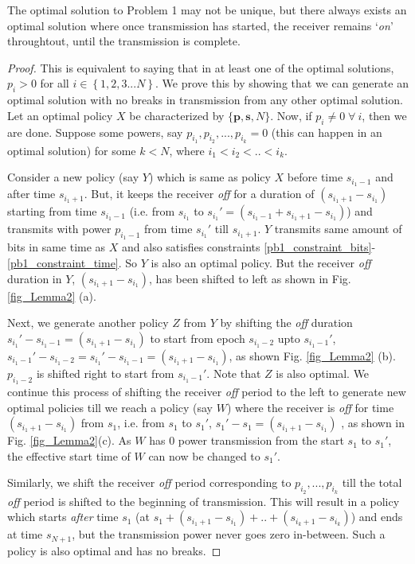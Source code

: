 \begin{lemma}
The optimal solution to Problem 1 may not be unique, but there always exists an optimal solution where once transmission has started, the receiver remains `\textit{on}' throughtout, until the transmission is complete. \label{lemma_nobreaks}
\end{lemma}
\begin{proof}
This is equivalent to saying that in at least one of the optimal solutions, $p_i>0$ for all $i\in\left\{ 1,2,3... N\right\}$. We prove this by showing that we can generate an optimal solution with no breaks in transmission from any other optimal solution. Let an optimal policy $X$ be characterized by $\{\bm{p},\bm{s},N\}$. Now, if $p_i\neq 0\; \forall \ i$, then we are done. Suppose some powers, say $p_{i_1},p_{i_2},...,p_{i_k}=0$ (this can happen in an optimal solution\footnotemark[\ref{note1}]) for some $k<N$, where $i_1<i_2<..<i_k$. 

Consider a new policy (say $Y$) which is same as policy $X$ before time $s_{i_1-1}$ and after time $s_{i_1+1}$. But, it keeps the receiver \textit{off} for a duration of $(s_{i_1+1}-s_{i_1})$ starting from time $s_{i_1-1}$ (i.e. from $s_{i_1}$ to $s_{i_1}'=(s_{i_1-1}+s_{i_1+1}-s_{i_1})$) and transmits with power $p_{i_1-1}$ from time $s_{i_1}'$ till $s_{i_1+1}$. $Y$ transmits same amount of bits in same time as $X$ and also satisfies constraints \eqref{pb1_constraint_bits}-\eqref{pb1_constraint_time}. So $Y$ is also an optimal policy. But the receiver \textit{off} duration in $Y$, $(s_{{i_1+1}}-s_{i_1})$, has been shifted to left as shown in Fig.\ref{fig_Lemma2} (a). 

Next, we generate another policy $Z$ from $Y$ by shifting the \textit{off} duration $s_{i_1}'-s_{i_1-1}=(s_{{i_1+1}}-s_{i_1})$ to start from epoch $s_{i_1-2}$ upto $s_{i_1-1}'$, $s_{i_1-1}'-s_{i_1-2}=s_{i_1}'-s_{i_1-1}=(s_{{i_1+1}}-s_{i_1})$, as shown Fig. \ref{fig_Lemma2} (b). $p_{i_1-2}$  is shifted right to start from $s_{i_1-1}'$. Note that $Z$ is also optimal. We continue this process of shifting the receiver \textit{off} period to the left to generate new optimal policies till we reach a policy (say $W$) where the receiver is \textit{off} for time $(s_{{i_1+1}}-s_{i_1})$ from $s_1$, i.e. from $s_{1}$ to $s_1'$, $s_1'-s_1=(s_{{i_1+1}}-s_{i_1})$ , as shown in Fig. \ref{fig_Lemma2}(c). As $W$ has $0$ power transmission from the start $s_1$ to $s_1'$, the effective start time of $W$ can now be changed to $s_1'$. 

Similarly, we shift the receiver \textit{off} period corresponding to $p_{i_2},...,p_{i_k}$ till the total \textit{off} period is shifted to the beginning of transmission. This will result in a policy which starts \textit{after} time $s_1$ (at $s_1+(s_{{i_1+1}}-s_{i_1})+..+(s_{{i_k+1}}-s_{i_k})$) and ends at time $s_{N+1}$, but the transmission power never goes zero in-between. Such a policy is also optimal and has no breaks.
\end{proof}
